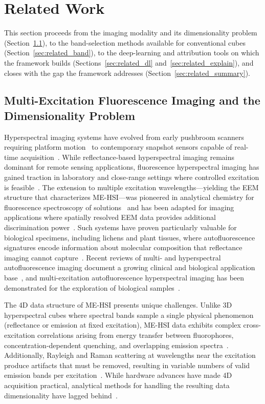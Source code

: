 \section{Related Work}
\label{sec:related_work}

This section proceeds from the imaging modality and its dimensionality problem (Section~\ref{sec:related_hsi}), to the band-selection methods available for conventional cubes (Section~\ref{sec:related_band}), to the deep-learning and attribution tools on which the framework builds (Sections~\ref{sec:related_dl} and~\ref{sec:related_explain}), and closes with the gap the framework addresses (Section~\ref{sec:related_summary}).

\subsection{Multi-Excitation Fluorescence Imaging and the Dimensionality Problem}
\label{sec:related_hsi}

Hyperspectral imaging systems have evolved from early pushbroom scanners requiring platform motion~\cite{goetz1985imaging} to contemporary snapshot sensors capable of real-time acquisition~\cite{hagen2013review}.
While reflectance-based hyperspectral imaging remains dominant for remote sensing applications, fluorescence hyperspectral imaging has gained traction in laboratory and close-range settings where controlled excitation is feasible~\cite{mishra2017close}.
The extension to multiple excitation wavelengths---yielding the EEM structure that characterizes ME-HSI---was pioneered in analytical chemistry for fluorescence spectroscopy of solutions~\cite{murphy2013fluorescence} and has been adapted for imaging applications where spatially resolved EEM data provides additional discrimination power~\cite{lavine2001exploratory}.
Such systems have proven particularly valuable for biological specimens, including lichens and plant tissues, where autofluorescence signatures encode information about molecular composition that reflectance imaging cannot capture~\cite{croce2019autofluorescence}.
Recent reviews of multi- and hyperspectral autofluorescence imaging document a growing clinical and biological application base~\cite{campbell2023beyondoncology}, and multi-excitation autofluorescence hyperspectral imaging has been demonstrated for the exploration of biological samples~\cite{ghaffari2019multiexcitation}.

The 4D data structure of ME-HSI presents unique challenges.
Unlike 3D hyperspectral cubes where spectral bands sample a single physical phenomenon (reflectance or emission at fixed excitation), ME-HSI data exhibits complex cross-excitation correlations arising from energy transfer between fluorophores, concentration-dependent quenching, and overlapping emission spectra~\cite{lakowicz2006principles}.
Additionally, Rayleigh and Raman scattering at wavelengths near the excitation produce artifacts that must be removed, resulting in variable numbers of valid emission bands per excitation~\cite{murphy2013fluorescence}.
While hardware advances have made 4D acquisition practical, analytical methods for handling the resulting data dimensionality have lagged behind~\cite{mishra2017close}.

